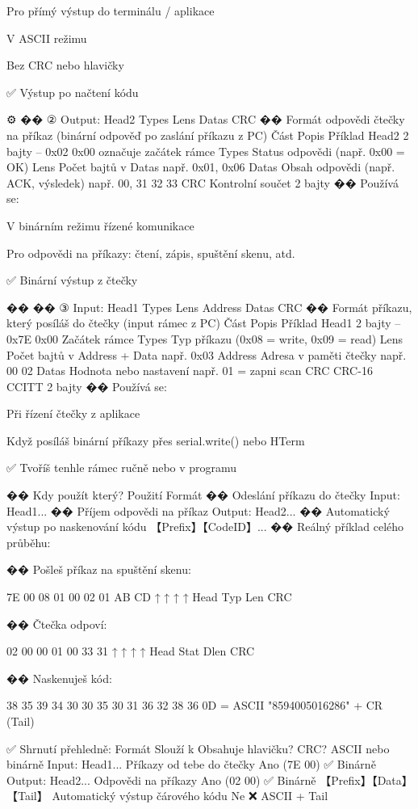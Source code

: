     Pro přímý výstup do terminálu / aplikace

    V ASCII režimu

    Bez CRC nebo hlavičky

    ✅ Výstup po načtení kódu

⚙️ �� ② Output: {Head2} {Types} {Lens} {Datas} {CRC}
�� Formát odpovědi čtečky na příkaz (binární odpověď po zaslání příkazu z PC)
Část	Popis	Příklad
Head2	2 bajty – 0x02 0x00	označuje začátek rámce
Types	Status odpovědi (např. 0x00 = OK)	
Lens	Počet bajtů v Datas	např. 0x01, 0x06
Datas	Obsah odpovědi (např. ACK, výsledek)	např. 00, 31 32 33
CRC	Kontrolní součet	2 bajty
�� Používá se:

    V binárním režimu řízené komunikace

    Pro odpovědi na příkazy: čtení, zápis, spuštění skenu, atd.

    ✅ Binární výstup z čtečky

�� �� ③ Input: {Head1} {Types} {Lens} {Address} {Datas} {CRC}
�� Formát příkazu, který posíláš do čtečky (input rámec z PC)
Část	Popis	Příklad
Head1	2 bajty – 0x7E 0x00	Začátek rámce
Types	Typ příkazu (0x08 = write, 0x09 = read)	
Lens	Počet bajtů v Address + Data	např. 0x03
Address	Adresa v paměti čtečky	např. 00 02
Datas	Hodnota nebo nastavení	např. 01 = zapni scan
CRC	CRC-16 CCITT	2 bajty
�� Používá se:

    Při řízení čtečky z aplikace

    Když posíláš binární příkazy přes serial.write() nebo HTerm

    ✅ Tvoříš tenhle rámec ručně nebo v programu

�� Kdy použít který?
Použití	Formát
�� Odeslání příkazu do čtečky	Input: {Head1}...
�� Příjem odpovědi na příkaz	Output: {Head2}...
�� Automatický výstup po naskenování kódu	【Prefix】【CodeID】...
�� Reálný příklad celého průběhu:

    �� Pošleš příkaz na spuštění skenu:

7E 00 08 01 00 02 01 AB CD
↑     ↑    ↑        ↑
Head  Typ  Len      CRC

    �� Čtečka odpoví:

02 00 00 01 00 33 31
↑     ↑    ↑     ↑
Head  Stat Dlen  CRC

    �� Naskenuješ kód:

38 35 39 34 30 30 35 30 31 36 32 38 36 0D
= ASCII "8594005016286" + CR (Tail)

✅ Shrnutí přehledně:
Formát	Slouží k	Obsahuje hlavičku?	CRC?	ASCII nebo binárně
Input: {Head1}...	Příkazy od tebe do čtečky	Ano (7E 00)	✅	Binárně
Output: {Head2}...	Odpovědi na příkazy	Ano (02 00)	✅	Binárně
【Prefix】【Data】【Tail】	Automatický výstup čárového kódu	Ne	❌	ASCII + Tail

